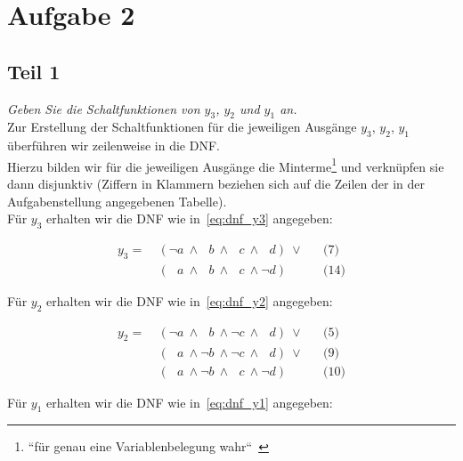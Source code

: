\chapter{Aufgabe 2}

\section{Teil 1}

\textit{Geben Sie die Schaltfunktionen von $y_3$, $y_2$ und $y_1$ an.}\\

\noindent
Zur Erstellung der Schaltfunktionen für die jeweiligen Ausgänge $y_3$, $y_2$, $y_1$ überführen wir zeilenweise in die DNF.\\
Hierzu bilden wir für die jeweiligen Ausgänge die Minterme\footnote{
    ``für genau eine Variablenbelegung wahr``~\cite[92]{Hof22}
} und verknüpfen sie dann disjunktiv (Ziffern in Klammern beziehen sich auf die Zeilen der in der Aufgabenstellung angegebenen Tabelle).\\

\noindent
Für $y_3$ erhalten wir die DNF wie in~\ref{eq:dnf_y3} angegeben:

\begin{equation}\label{eq:dnf_y3}
\begin{alignat}{3}
    y_3 =\ &(\neg a \ \land \phantom{\neg} b \ \land \phantom{\neg} c \ \land \phantom{\neg} d)\ \lor && \text{(7)} \\
          &(\phantom{\neg} a \ \land \phantom{\neg} b \ \land \phantom{\neg} c \ \land \neg d) && \text{(14)}
\end{alignat}
\end{equation}

\noindent
Für $y_2$ erhalten wir die DNF wie in~\ref{eq:dnf_y2} angegeben:

\begin{equation}\label{eq:dnf_y2}
\begin{alignat}{3}
    y_2 =\ &(\neg a \ \land \phantom{\neg} b \ \land \neg c \ \land \phantom{\neg} d)\ \lor && \text{(5)} \\
    &(\phantom{\neg} a \ \land \neg b \ \land \neg c \ \land \phantom{\neg} d)\ \lor && \text{(9)}  \\
    &(\phantom{\neg} a \ \land \neg b \ \land  \phantom{\neg} c \ \land \neg d) && \text{(10)}
\end{alignat}
\end{equation}

\noindent
Für $y_1$ erhalten wir die DNF wie in~\ref{eq:dnf_y1} angegeben:

